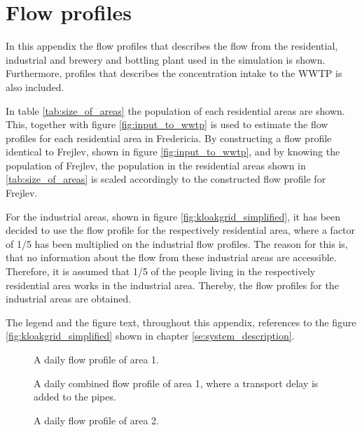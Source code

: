 \newpage
\section{Flow profiles}\label{app:flow_profiles}
In this appendix the flow profiles that describes the flow from the residential, industrial and brewery and bottling plant used in the simulation is shown. Furthermore, profiles that describes the concentration intake to the WWTP is also included.


In table \ref{tab:size_of_areas} the population of each residential areas are shown. This, together with figure \ref{fig:input_to_wwtp} is used to estimate the flow profiles for each residential area in Fredericia. By constructing a flow profile identical to Frejlev, shown in figure \ref{fig:input_to_wwtp}, and by knowing the population of Frejlev, the population in the residential areas shown in \ref{tab:size_of_areas} is scaled accordingly to the constructed flow profile for Frejlev.

For the industrial areas, shown in figure \ref{fig:kloakgrid_simplified}, it has been decided to use the flow profile for the respectively residential area, where a factor of 1/5 has been multiplied on the industrial flow profiles. The reason for this is, that no information about the flow from these industrial areas are accessible. Therefore, it is assumed that 1/5 of the people living in the respectively residential area works in the industrial area. Thereby, the flow profiles for the industrial areas are obtained.  




The legend and the figure text, throughout this appendix, references to the figure \ref{fig:kloakgrid_simplified} shown in chapter \ref{se:system_description}. 
\begin{figure}[H]
\centering

\caption{A daily flow profile of area 1.}
\label{fig:APP_flow_profile_thulevej}
\end{figure} 

\begin{figure}[H]
\centering

\caption{A daily combined flow profile of area 1, where a transport delay is added to the pipes.}
\label{fig:flow_profile_zone_1_combined_with_delay}
\end{figure} 

\begin{figure}[H]
\centering

\caption{A daily flow profile of area 2.}
\label{fig:APP_flow_profile_zone2}
\end{figure} 


